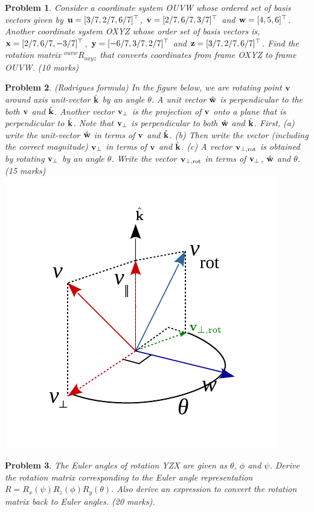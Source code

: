 \documentclass{article}
\newtheorem{prob}{Problem}
\begin{document}
\begin{prob}
  Consider a coordinate system OUVW whose ordered set of basis vectors given by
  $\mathbf{u} = [3/7, 2/7, 6/7]^\top$, $\mathbf{v} = [2/7, 6/7, 3/7]^\top$ and $\mathbf{w} = [4,
  5, 6]^\top$.
  Another coordinate system OXYZ whose order set of basis vectors is, $\mathbf{x} =
  [2/7, 6/7, -3/7]^\top$, $\mathbf{y} = [-6/7, 3/7, 2/7]^\top$ and $\mathbf{z} = [3/7, 2/7, 6/7]^\top$.
  Find the rotation matrix $^{ouvw}R_{oxyz}$ that converts coordinates from frame OXYZ to frame OUVW. (10 marks)
\end{prob}
\newpage

\begin{prob}
  (Rodrigues formula) In the figure below, we are rotating point $\mathbf{v}$ around
  axis unit-vector $\hat{\mathbf{k}}$ by an angle $\theta$. A unit vector $\hat{\mathbf{w}}$ is
  perpendicular to the both $\mathbf{v}$ and $\hat{\mathbf{k}}$. Another vector $\mathbf{v}_{\perp}$ is the projection of $\mathbf{v}$ onto a plane that is perpendicular to $\hat{\mathbf{k}}$. Note that $\mathbf{v}_{\perp}$ is perpendicular to both $\hat{\mathbf{w}}$ and $\hat{\mathbf{k}}$. First, (a) write the
  unit-vector $\hat{\mathbf{w}}$ in terms of $\mathbf{v}$ and $\hat{\mathbf{k}}$.
  (b) Then write the vector (including the correct magnitude) $\mathbf{v}_\perp$ in terms of $\mathbf{v}$ and $\hat{\mathbf{k}}$.
  (c) A vector $\mathbf{v}_{\perp,\text{rot}}$ is obtained by rotating $\mathbf{v}_\perp$ by an angle $\theta$. Write the vector $\mathbf{v}_{\perp,\text{rot}}$ in terms of $\mathbf{v}_{\perp}$, $\hat{\mathbf{w}}$ and $\theta$. 
  (15 marks)\\
  \includegraphics[width=0.5\linewidth]{media/Rodrigues-formula.pdf}
\end{prob}

\newpage

\begin{prob}
  The Euler angles of rotation YZX are given as $\theta$, $\phi$ and $\psi$.
  Derive the rotation matrix corresponding to the Euler angle representation $R = R_x(\psi) R_z(\phi) R_y(\theta)$. Also derive an expression to convert the rotation matrix back to Euler angles. (20 marks).
\end{prob}

\newpage
\end{document}
